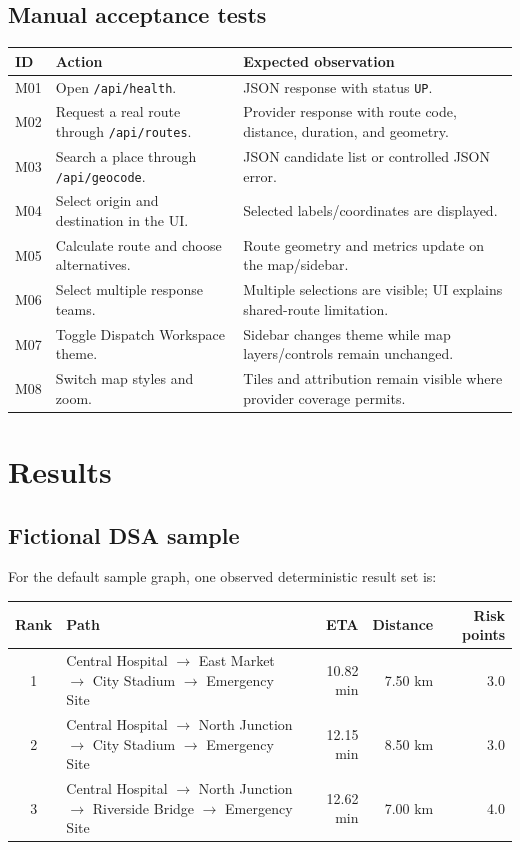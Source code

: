 \documentclass[11pt,a4paper]{article}
\begin{document}
\subsection{Manual acceptance tests}
\begin{longtable}{p{} p{} p{}}
\toprule
\textbf{ID} & \textbf{Action} & \textbf{Expected observation}\\
\midrule
M01 & Open \texttt{/api/health}. & JSON response with status \texttt{UP}.\\
M02 & Request a real route through \texttt{/api/routes}. & Provider response with route code, distance, duration, and geometry.\\
M03 & Search a place through \texttt{/api/geocode}. & JSON candidate list or controlled JSON error.\\
M04 & Select origin and destination in the UI. & Selected labels/coordinates are displayed.\\
M05 & Calculate route and choose alternatives. & Route geometry and metrics update on the map/sidebar.\\
M06 & Select multiple response teams. & Multiple selections are visible; UI explains shared-route limitation.\\
M07 & Toggle Dispatch Workspace theme. & Sidebar changes theme while map layers/controls remain unchanged.\\
M08 & Switch map styles and zoom. & Tiles and attribution remain visible where provider coverage permits.\\
\bottomrule
\end{longtable}

\section{Results}
\subsection{Fictional DSA sample}
For the default sample graph, one observed deterministic result set is:
\begin{center}
\small
\begin{tabularx}{0.97\textwidth}{c X r r r}
\toprule
\textbf{Rank} & \textbf{Path} & \textbf{ETA} & \textbf{Distance} & \textbf{Risk points}\\
\midrule
1 & Central Hospital $\to$ East Market $\to$ City Stadium $\to$ Emergency Site & 10.82 min & 7.50 km & 3.0\\
2 & Central Hospital $\to$ North Junction $\to$ City Stadium $\to$ Emergency Site & 12.15 min & 8.50 km & 3.0\\
3 & Central Hospital $\to$ North Junction $\to$ Riverside Bridge $\to$ Emergency Site & 12.62 min & 7.00 km & 4.0\\
\bottomrule
\end{tabularx}
\end{center}
\end{document}
